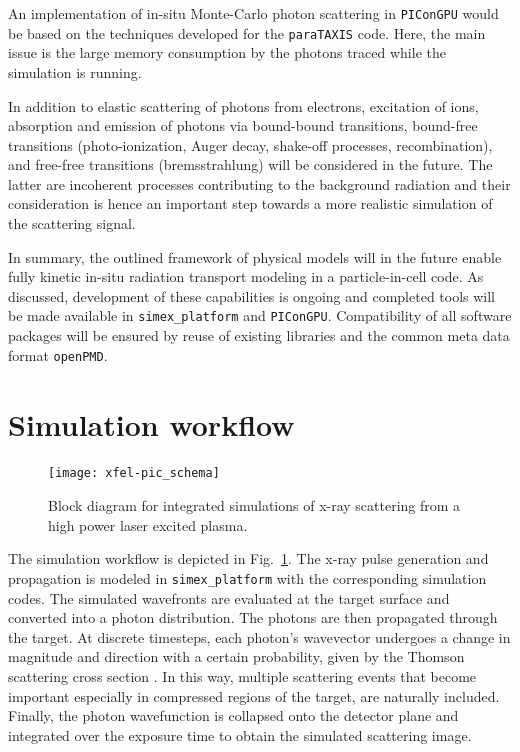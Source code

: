 \documentclass[10pt]{scrartcl}
\begin{document}
An implementation of in-situ Monte-Carlo photon scattering in \texttt{PIConGPU}
would be based on the techniques developed for the \texttt{paraTAXIS} code. Here, the
main issue is the large memory consumption by the photons traced while the
simulation is running.

In addition to elastic scattering of photons from electrons,
excitation of ions, absorption and emission of photons via bound-bound
transitions,
bound-free transitions (photo-ionization, Auger decay, shake-off processes, recombination),
and free-free transitions (bremsstrahlung) will be considered in
the future. The latter are incoherent processes contributing to the background
radiation and their consideration is hence an important step towards a more
realistic simulation of the scattering signal.

In summary, the outlined
framework of physical models will in the future enable fully kinetic in-situ radiation
transport modeling in a particle-in-cell code.
As discussed, development of these capabilities is ongoing and completed tools
will be made available in \texttt{simex\_platform} and \texttt{PIConGPU}.
Compatibility of all software packages will be ensured by reuse of existing
libraries and the common meta data format \texttt{openPMD}.

\section{Simulation workflow}
%
\begin{figure}[ht]
  \begin{center}
    \texttt{[image: xfel-pic\_schema]}
  \end{center}
  \caption{Block diagram for integrated simulations of x-ray scattering from a high
  power laser excited plasma.}
  \label{fig:xfel-pic_schema}
\end{figure}

The simulation workflow is depicted in Fig.~\ref{fig:xfel-pic_schema}. The x-ray
pulse generation and propagation is modeled in \texttt{simex\_platform} with the
corresponding simulation codes. The simulated wavefronts are evaluated at the
target surface and converted into a photon distribution. The photons are then
propagated through the target. At discrete timesteps, each photon's wavevector
undergoes a change in magnitude and direction with a
certain probability, given by the Thomson scattering cross section
\cite{Jackson1975}. In this way, multiple scattering events that become
important especially in compressed regions of the target, are naturally
included. Finally, the photon wavefunction is collapsed onto the detector plane
and integrated over the exposure time to obtain the simulated scattering image.
%
%
\end{document}
